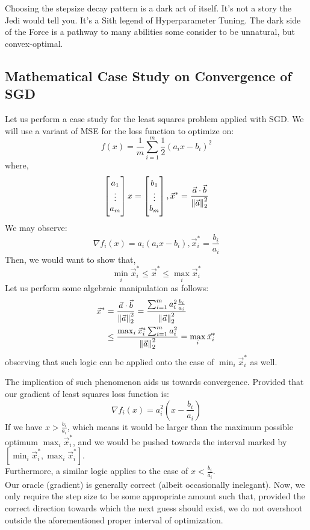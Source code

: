 Choosing the stepsize decay pattern is a dark art of itself.
It’s not a story the Jedi would tell you. It’s a Sith legend of Hyperparameter Tuning.
The dark side of the Force is a pathway to many abilities some consider to be unnatural, but convex-optimal.

\subsection{Mathematical Case Study on Convergence of SGD}
Let us perform a case study for the least squares problem applied with SGD.
We will use a variant of MSE for the loss function to optimize on:
\[
    f(x) = \frac{1}{m} \sum_{i = 1}^m \frac{1}{2} {(a_i x - b_i)}^2
\]
where,
\[
    \begin{bmatrix} a_1 \\ \vdots \\ a_m \end{bmatrix} x =
    \begin{bmatrix} b_1 \\ \vdots \\ b_m \end{bmatrix}, \vec{x}^* = \frac{\vec{a} \cdot \vec{b}}{\pnorm[2]{\vec{a}}{2}}
\]
We may observe:
\[
    \nabla f_i (x) = a_i (a_i x - b_i), \vec{x}_i^* = \frac{b_i}{a_i}
\]
Then, we would want to show that,
\[
    \min_i \vec{x}_i^* \leq \vec{x}^* \leq \max_i \vec{x}_i^*
\]
Let us perform some algebraic manipulation as follows:
\begin{align*}
    \vec{x}^* &= \frac{\vec{a} \cdot \vec{b}}{\pnorm[2]{\vec{a}}{2}}
    = \frac{\sum_{i = 1}^m a_i^2 \frac{b_i}{a_i}}{\pnorm[2]{\vec{a}}{2}} \\
    &\leq \frac{\max_i \vec{x}_i^* \sum_{i = 1}^m a_i^2}{\pnorm[2]{\vec{a}}{2}}
    = \max_i \vec{x}_i^*
\end{align*}
observing that such logic can be applied onto the case of $\min_i \vec{x}_i^*$ as well.

The implication of such phenomenon aids us towards convergence.
Provided that our gradient of least squares loss function is:
\[
    \nabla f_i (x) = a_i^2 (x - \frac{b_i}{a_i})
\]
If we have $x > \frac{b_i}{a_i}$, which means it would be larger than the maximum possible optimum $\max_i \vec{x}_i^*$, and we would be pushed towards the interval marked by $[\min_i \vec{x}_i^*, \max_i \vec{x}_i^*]$. \\
Furthermore, a similar logic applies to the case of $x < \frac{b_i}{a_i}$. \\
Our oracle (gradient) is generally correct (albeit occasionally inelegant). Now, we only require the step size to be some appropriate amount such that, provided the correct direction towards which the next guess should exist, we do not overshoot outside the aforementioned proper interval of optimization.

